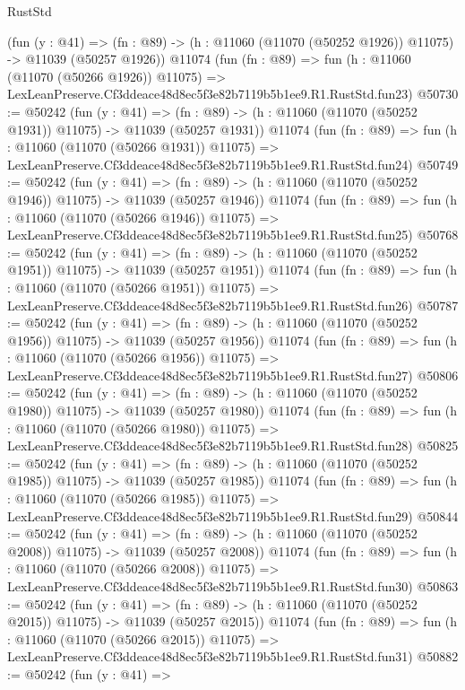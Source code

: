\begin{lexlean}{RustStd}
\begin{coremodule}
    (fun (y : @41) =>
    (fn : @89) -> (h : @11060 (@11070 (@50252 @1926)) @11075) -> @11039 (@50257 @1926))
    @11074
    (fun (fn : @89) =>
    fun (h : @11060 (@11070 (@50266 @1926)) @11075) =>
    LexLeanPreserve.Cf3ddeace48d8ec5f3e82b7119b5b1ee9.R1.RustStd.fun23)
@50730 := @50242
    (fun (y : @41) =>
    (fn : @89) -> (h : @11060 (@11070 (@50252 @1931)) @11075) -> @11039 (@50257 @1931))
    @11074
    (fun (fn : @89) =>
    fun (h : @11060 (@11070 (@50266 @1931)) @11075) =>
    LexLeanPreserve.Cf3ddeace48d8ec5f3e82b7119b5b1ee9.R1.RustStd.fun24)
@50749 := @50242
    (fun (y : @41) =>
    (fn : @89) -> (h : @11060 (@11070 (@50252 @1946)) @11075) -> @11039 (@50257 @1946))
    @11074
    (fun (fn : @89) =>
    fun (h : @11060 (@11070 (@50266 @1946)) @11075) =>
    LexLeanPreserve.Cf3ddeace48d8ec5f3e82b7119b5b1ee9.R1.RustStd.fun25)
@50768 := @50242
    (fun (y : @41) =>
    (fn : @89) -> (h : @11060 (@11070 (@50252 @1951)) @11075) -> @11039 (@50257 @1951))
    @11074
    (fun (fn : @89) =>
    fun (h : @11060 (@11070 (@50266 @1951)) @11075) =>
    LexLeanPreserve.Cf3ddeace48d8ec5f3e82b7119b5b1ee9.R1.RustStd.fun26)
@50787 := @50242
    (fun (y : @41) =>
    (fn : @89) -> (h : @11060 (@11070 (@50252 @1956)) @11075) -> @11039 (@50257 @1956))
    @11074
    (fun (fn : @89) =>
    fun (h : @11060 (@11070 (@50266 @1956)) @11075) =>
    LexLeanPreserve.Cf3ddeace48d8ec5f3e82b7119b5b1ee9.R1.RustStd.fun27)
@50806 := @50242
    (fun (y : @41) =>
    (fn : @89) -> (h : @11060 (@11070 (@50252 @1980)) @11075) -> @11039 (@50257 @1980))
    @11074
    (fun (fn : @89) =>
    fun (h : @11060 (@11070 (@50266 @1980)) @11075) =>
    LexLeanPreserve.Cf3ddeace48d8ec5f3e82b7119b5b1ee9.R1.RustStd.fun28)
@50825 := @50242
    (fun (y : @41) =>
    (fn : @89) -> (h : @11060 (@11070 (@50252 @1985)) @11075) -> @11039 (@50257 @1985))
    @11074
    (fun (fn : @89) =>
    fun (h : @11060 (@11070 (@50266 @1985)) @11075) =>
    LexLeanPreserve.Cf3ddeace48d8ec5f3e82b7119b5b1ee9.R1.RustStd.fun29)
@50844 := @50242
    (fun (y : @41) =>
    (fn : @89) -> (h : @11060 (@11070 (@50252 @2008)) @11075) -> @11039 (@50257 @2008))
    @11074
    (fun (fn : @89) =>
    fun (h : @11060 (@11070 (@50266 @2008)) @11075) =>
    LexLeanPreserve.Cf3ddeace48d8ec5f3e82b7119b5b1ee9.R1.RustStd.fun30)
@50863 := @50242
    (fun (y : @41) =>
    (fn : @89) -> (h : @11060 (@11070 (@50252 @2015)) @11075) -> @11039 (@50257 @2015))
    @11074
    (fun (fn : @89) =>
    fun (h : @11060 (@11070 (@50266 @2015)) @11075) =>
    LexLeanPreserve.Cf3ddeace48d8ec5f3e82b7119b5b1ee9.R1.RustStd.fun31)
@50882 := @50242
    (fun (y : @41) =>

\end{coremodule}
\end{lexlean}
